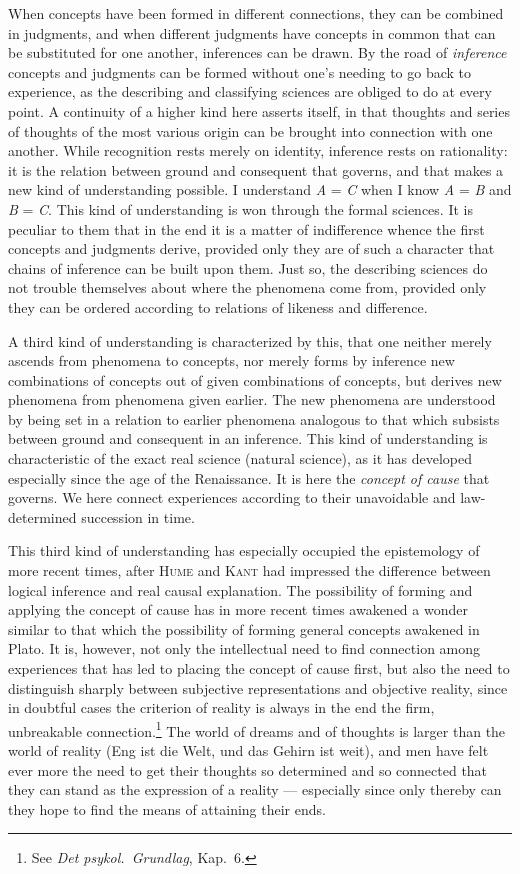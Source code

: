 \documentclass[12pt,a4paper]{book}
\newcommand{\opage}[1]{\marginnote{\footnotesize\textit{[#1]}}}
\begin{document}
When concepts have been formed in different connections, they can be combined in
judgments, and when different judgments have concepts in common that can be
substituted for one another, inferences can be drawn. By the road of
\emph{inference} concepts and judgments can be formed without one's needing to
go back to experience, as the describing and classifying sciences are obliged to
do at every point. A continuity of a higher kind here asserts itself, in that
thoughts and series of thoughts of the most various origin can be brought into
connection with one another. While recognition rests merely on identity,
inference rests on rationality: it is the relation between ground and consequent
that governs, and that makes a new kind of understanding possible. I understand
\textit{A} = \textit{C} when I know \textit{A} = \textit{B} and \textit{B} =
\textit{C}. This kind of understanding is won through the formal sciences. It is
peculiar to them that in the end it is a matter of indifference whence the first
concepts and judgments derive, provided only they are of such a character that
chains of inference can be built upon them. Just so, the describing sciences do
not trouble themselves about where the phenomena come from, provided only they
can be ordered according to relations of likeness and difference.

A third kind of understanding is characterized by this, that one \opage{30}neither merely
ascends from phenomena to concepts, nor merely forms by inference new
combinations of concepts out of given combinations of concepts, but derives new
phenomena from phenomena given earlier. The new phenomena are understood by
being set in a relation to earlier phenomena analogous to that which subsists
between ground and consequent in an inference. This kind of understanding is
characteristic of the exact real science (natural science), as it has developed
especially since the age of the Renaissance. It is here the \emph{concept of
cause} that governs. We here connect experiences according to their unavoidable
and law-determined succession in time.

This third kind of understanding has especially occupied the epistemology of
more recent times, after \textsc{Hume} and \textsc{Kant} had impressed the
difference between logical inference and real causal explanation. The
possibility of forming and applying the concept of cause has in more recent
times awakened a wonder similar to that which the possibility of forming general
concepts awakened in Plato. It is, however, not only the intellectual need to
find connection among experiences that has led to placing the concept of cause
first, but also the need to distinguish sharply between subjective
representations and objective reality, since in doubtful cases the criterion of
reality is always in the end the firm, unbreakable connection.\footnote{See
\textit{Det psykol.\ Grundlag}, Kap.~6.} The world of dreams and of thoughts is
larger than the world of reality (Eng ist die Welt, und das Gehirn ist weit),
and men have felt ever more the need to get their thoughts so determined and so
connected that they can stand as the expression of a reality --- especially
since only thereby can they hope to find the means of attaining their ends.
\end{document}
